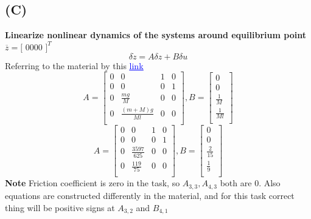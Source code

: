 \documentclass[a4paper,11pt]{article}
\theoremstyle{mytheor}
\begin{document}
\subsection*{(C)} 
\textbf{Linearize nonlinear dynamics of the systems around equilibrium point} $\overline{z} = [$ $0$\space\space$0$\space\space$0$\space\space$0$ $]^{T}$\newline
\[
\delta\dot{z}=A\delta z+B\delta u
\]
Referring to the material by this           
\href{http://leo.technion.ac.il/Courses/LS/lect03.pdf}{\textcolor{blue}{\underline{link}}}\newline
\[
A=
\begin{bmatrix}
0&0&1&0\\
0&0&0&1\\
0&\frac{mg}{M}&0&0\\
0&\frac{(m+M)g}{Ml}&0&0\\
\end{bmatrix}
,B=
\begin{bmatrix}
0\\
0\\
\frac{1}{M}\\
\frac{1}{Ml}\\
\end{bmatrix}
\]
\[
A=
\begin{bmatrix}
0&0&1&0\\
0&0&0&1\\
0&\frac{3597}{625}&0&0\\
0&\frac{119}{75}&0&0\\
\end{bmatrix}
,B=
\begin{bmatrix}
0\\
0\\
\frac{2}{15}\\
\frac{1}{9}\\
\end{bmatrix}
\]
\textbf{Note}\newline
Friction coefficient is zero in the task, so $A_{3,3}, A_{4,3}$ both are $0$.\newline
Also equations are constructed differently in the material, and for this task correct thing will be positive signs at $A_{3,2}$ and $B_{4,1}$
\end{document}
